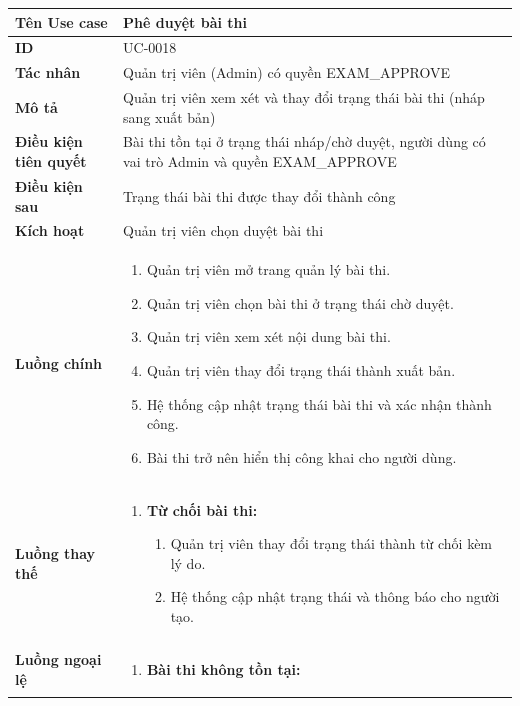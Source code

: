 {
\small
\renewcommand{\arraystretch}{1.15}

\begin{tabularx}{\textwidth}{|>{\raggedright\arraybackslash}p{3.5cm}|>{\raggedright\arraybackslash}X|}
\hline
\textbf{Tên Use case} & Phê duyệt bài thi \\
\hline
\textbf{ID} & UC-0018 \\
\hline
\textbf{Tác nhân} & Quản trị viên (Admin) có quyền EXAM\_APPROVE \\
\hline
\textbf{Mô tả} & Quản trị viên xem xét và thay đổi trạng thái bài thi (nháp sang xuất bản) \\
\hline
\textbf{Điều kiện tiên quyết} & Bài thi tồn tại ở trạng thái nháp/chờ duyệt, người dùng có vai trò Admin và quyền EXAM\_APPROVE \\
\hline
\textbf{Điều kiện sau} & Trạng thái bài thi được thay đổi thành công \\
\hline
\textbf{Kích hoạt} & Quản trị viên chọn duyệt bài thi \\
\hline
\textbf{Luồng chính} &
\begin{enumerate}
    \item Quản trị viên mở trang quản lý bài thi.
    \item Quản trị viên chọn bài thi ở trạng thái chờ duyệt.
    \item Quản trị viên xem xét nội dung bài thi.
    \item Quản trị viên thay đổi trạng thái thành xuất bản.
    \item Hệ thống cập nhật trạng thái bài thi và xác nhận thành công.
    \item Bài thi trở nên hiển thị công khai cho người dùng.
\end{enumerate} \\
\hline
\textbf{Luồng thay thế} &
\begin{enumerate}
    \item \textbf{Từ chối bài thi:}
    \begin{enumerate}
        \item[4A.] Quản trị viên thay đổi trạng thái thành từ chối kèm lý do.
        \item[5A.] Hệ thống cập nhật trạng thái và thông báo cho người tạo.
    \end{enumerate}
\end{enumerate} \\
\hline
\textbf{Luồng ngoại lệ} &
\begin{enumerate}
    \item \textbf{Bài thi không tồn tại:}

\end{enumerate}
\end{tabularx}}
